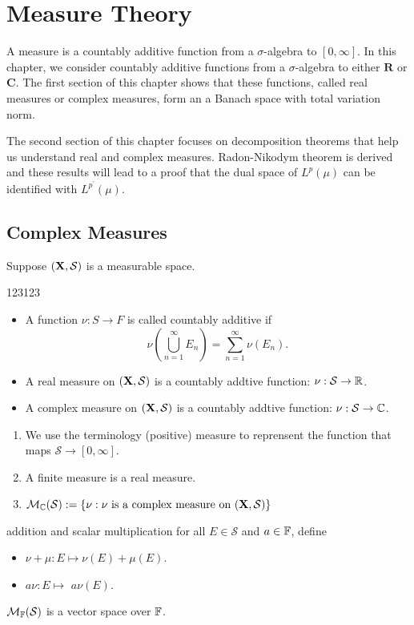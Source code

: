 \chapter{Measure Theory} 
A measure is a countably additive function from a $\sigma$-algebra to $[0, \infty] .$ In this chapter, we consider countably additive functions from a $\sigma$-algebra to either $\mathbf{R}$ or $\mathbf{C}$. The first section of this chapter shows that these functions, called real measures or complex measures, form an a Banach space with total variation norm.

The second section of this chapter focuses on decomposition theorems that help us understand real and complex measures. Radon-Nikodym theorem is derived and 
these results will lead to a proof that the dual space of $L^p(\mu)$ can be identified with $L^{p^{\prime}}(\mu)$.
\newpage
\section{Complex Measures}
Suppose $(\mathbf{X},\mathcal S)$ is a measurable space.

\begin{sdefinition}{123}{123}
\begin{itemize}
	\item A function $\nu:S \to F$ is called countably additive if \\
	$$
	\nu(\bigcup_{n=1}^\infty E_n) = \sum_{n=1}^{\infty} \nu(E_n).
	$$
	\item A real measure on $(\mathbf{X},\mathcal S)$ is a countably addtive function: $\nu : \mathcal S \to \mathbb{R}$.
	\item A complex measure on $(\mathbf{X},\mathcal S)$ is a countably addtive function: $\nu : \mathcal S \to \mathbb{C}$.
\end{itemize}	
\end{sdefinition}


\begin{sremark}{}{}
\begin{enumerate}
  \item 	We use the terminology (positive) measure to reprensent the function that maps $ \mathcal S \to [0,\infty]$.
  \item A finite measure is a real measure.
  \item $\M_{\C}(\mathcal S):=\{\nu:\nu \ \text{is a complex measure on}\ (\X,\mathcal S) \}$
\end{enumerate}
\end{sremark}

\begin{sdefinition}{addition and scalar multiplication}{}
for all $E\in \mathcal S$ and $a \in \mathbb{F}$, define
\begin{itemize}
	\item $\nu+\mu: E \mapsto \nu(E)+\mu(E)$.
	\item $a\nu: E \mapsto$ $a\nu(E)$.
\end{itemize}
\end{sdefinition}
\begin{stheorem}{}{}
$\mathcal{M}_{\mathbb{F}}(\mathcal S)$	is a vector space over $\mathbb{F}$.
\end{stheorem}


